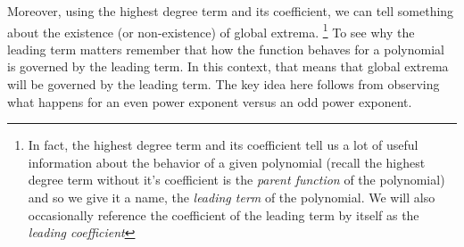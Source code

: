 \documentclass{ximera}
\begin{document}
        
        Moreover, using the highest degree term and its coefficient, we can tell something about the existence (or non-existence) of global extrema.%
        \footnote{In fact, the highest degree term and its coefficient tell us a lot of useful information about the behavior of a given polynomial (recall the highest degree term without it's coefficient is the \textit{parent function} of the polynomial) and so we give it a name, the \textit{leading term} of the polynomial. We will also occasionally reference the coefficient of the leading term by itself as the \textit{leading coefficient}}
        To see why the leading term matters remember that how the function behaves for a polynomial is governed by the leading term. In this context, that means that global extrema will be governed by the leading term. The key idea here follows from observing what happens for an even power exponent versus an odd power exponent.
%
%
%
%
\end{document}
